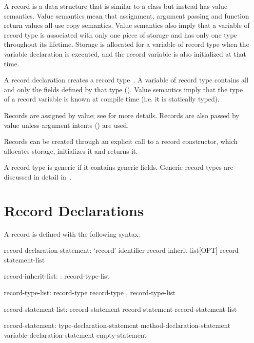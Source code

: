 \label{Records}

A record is a data structure that is similar to a class but instead has value
semantics.  Value semantics mean that assignment, argument passing and function
return values all use copy semantics.  Value semantics also imply that a
variable of record type is associated with only one piece of storage and has
only one type throughout its lifetime.  Storage is allocated for a variable of
record type when the variable declaration is executed, and the record variable
is also initialized at that time.

A record declaration creates a record type~.  A
variable of record type contains all and only the fields defined by that type
().  Value semantics imply that the type of a record variable
is known at compile time (i.e. it is statically typed).  

Records are assigned by value;
see  for more details.  Records are also passed
by value unless argument intents () are used.

Records can be created through an explicit call to a record
constructor, which allocates storage, initializes
it and returns it.  

A record type is generic if it contains generic fields.  Generic record types
are discussed in detail in~.

\section{Record Declarations}
\label{Record_Declarations}

A record is defined with the following syntax:
\begin{syntax}
record-declaration-statement:
  `record' identifier record-inherit-list[OPT] {
    record-statement-list }

record-inherit-list:
  : record-type-list

record-type-list:
  record-type
  record-type , record-type-list

record-statement-list:
  record-statement
  record-statement record-statement-list

record-statement:
  type-declaration-statement
  method-declaration-statement
  variable-declaration-statement
  empty-statement
\end{syntax}

